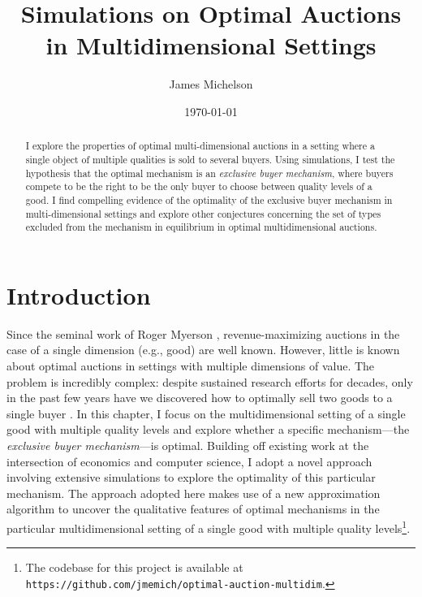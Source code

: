 \documentclass{article}
\title{Simulations on Optimal Auctions in Multidimensional Settings}
\author{James Michelson}
\date{\today}
\providecommand{\keywords}[1]{\textbf{Keywords:} #1}
\begin{document}
\maketitle

\begin{abstract}
I explore the properties of optimal multi-dimensional auctions in a setting where a single object of multiple qualities is sold to several buyers. Using simulations, I test the hypothesis that the optimal mechanism is an \textit{exclusive buyer mechanism}, where buyers compete to be the right to be the only buyer to choose between quality levels of a good. I find compelling evidence of the optimality of the exclusive buyer mechanism in multi-dimensional settings and explore other conjectures concerning the set of types excluded from the mechanism in equilibrium in optimal multidimensional auctions.

\end{abstract}

\tableofcontents


\section{Introduction}

Since the seminal work of Roger Myerson \autocite*{myerson1981optimal}, revenue-maximizing auctions in the case of a single dimension (e.g., good) are well known. However, little is known about optimal auctions in settings with multiple dimensions of value. The problem is incredibly complex: despite sustained research efforts for decades, only in the past few years have we discovered how to optimally sell two goods to a single buyer \autocite{daskalakis2017strong}. In this chapter, I focus on the multidimensional setting of a single good with multiple quality levels and explore whether a specific mechanism---the \textit{exclusive buyer mechanism}---is optimal. Building off existing work at the intersection of economics and computer science, I adopt a novel approach involving extensive simulations to explore the optimality of this particular mechanism. The approach adopted here makes use of a new approximation algorithm to uncover the qualitative features of optimal mechanisms in the particular multidimensional setting of a single good with multiple quality levels\footnote{The codebase for this project is available at \texttt{https://github.com/jmemich/optimal-auction-multidim}.}.
\end{document}
